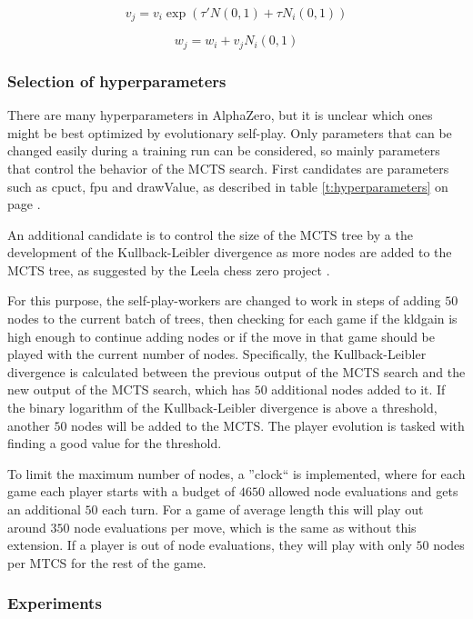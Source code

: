 \documentclass[12pt,onecolumn,oneside,titlepage]{article}
\begin{document}
\begin{equation}
 v_j = v_i \exp (\tau'N(0,1) + \tau N_i(0, 1))\label{eq:mutate_v}
\end{equation}

\begin{equation}
 w_j = w_i + v_j N_i(0, 1)\label{eq:mutate_w}
\end{equation}

\subsubsection{Selection of hyperparameters}

There are many hyperparameters in AlphaZero, but it is unclear which ones might be best optimized by evolutionary self-play. Only parameters that can be changed easily during a training run can be considered, so mainly parameters that control the behavior of the MCTS search.
First candidates are parameters such as cpuct, fpu and drawValue, as described in table \ref{t:hyperparameters} on page \pageref{t:hyperparameters}.

An additional candidate is to control the size of the MCTS tree by a the development of the Kullback-Leibler divergence as more nodes are added to the MCTS tree, as suggested by the Leela chess zero project \cite{leela0kldgain}. 

For this purpose, the self-play-workers are changed to work in steps of adding $50$ nodes to the current batch of trees,
then checking for each game if the kldgain is high enough to continue adding nodes or if the move in that game should be played with the current number of nodes.
Specifically, the Kullback-Leibler divergence is calculated between the previous output of the MCTS search and the new output of the MCTS search, which has $50$ additional nodes added to it.
If the binary logarithm of the Kullback-Leibler divergence is above a threshold, another $50$ nodes will be added to the MCTS. The player evolution is tasked with finding a good value for the threshold.

To limit the maximum number of nodes, a ''clock`` is implemented, where for each game each player starts with a budget of $4650$ allowed node evaluations and gets an additional $50$ each turn.
For a game of average length this will play out around $350$ node evaluations per move, which is the same as without this extension. If a player is out of node evaluations, they will play with only $50$ nodes per MTCS for the rest of the game.

\subsubsection{Experiments}
\end{document}
